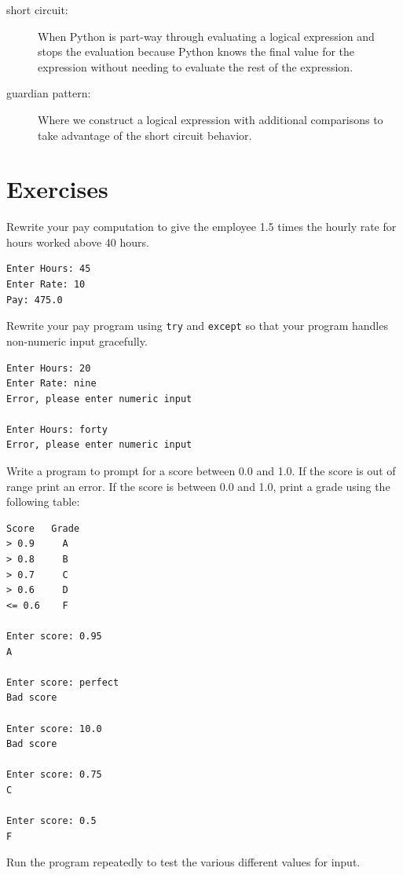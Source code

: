 \documentclass[10pt]{book}
\begin{document}
\begin{description}
\item[short circuit:]  When Python is part-way through evaluating a 
logical expression and stops the evaluation because Python 
knows the final value for the expression 
without needing to evaluate the rest of the expression.

\item[guardian pattern:] Where we construct a logical expression 
with additional
comparisons to take advantage of the short circuit behavior.

\end{description}

\section{Exercises}

\begin{ex}
Rewrite your pay computation to give the employee 1.5 
times the hourly rate for 
hours worked above 40 hours.

\begin{verbatim}
Enter Hours: 45
Enter Rate: 10
Pay: 475.0
\end{verbatim}
\end{ex}

\begin{ex}
Rewrite your pay program using {\tt try} and {\tt except} 
so that your program handles non-numeric input gracefully.

\begin{verbatim}
Enter Hours: 20
Enter Rate: nine
Error, please enter numeric input

Enter Hours: forty
Error, please enter numeric input
\end{verbatim}
\end{ex}

\begin{ex}
Write a program to prompt for a score between 0.0 and 1.0.
If the score is out of range print an error.  If the score
is between 0.0 and 1.0, print a grade using the following 
table:
\begin{verbatim}
Score   Grade
> 0.9     A
> 0.8     B
> 0.7     C
> 0.6     D
<= 0.6    F

Enter score: 0.95
A

Enter score: perfect
Bad score

Enter score: 10.0
Bad score

Enter score: 0.75
C

Enter score: 0.5
F
\end{verbatim}

Run the program repeatedly to test the various different values
for input.
\end{ex}
\end{document}
